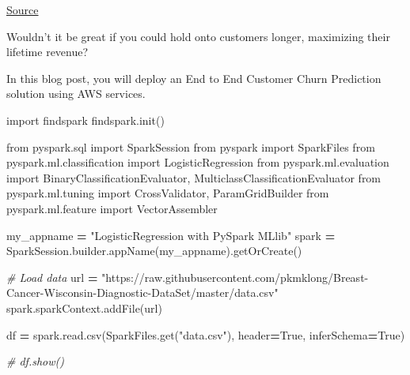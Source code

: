 \documentclass[
]{book}
\newenvironment{Shaded}{\begin{snugshade}}{\end{snugshade}}
\newcommand{\CommentTok}[1]{\textcolor[rgb]{0.56,0.35,0.01}{\textit{#1}}}
\newcommand{\ImportTok}[1]{#1}
\newcommand{\NormalTok}[1]{#1}
\newcommand{\OperatorTok}[1]{\textcolor[rgb]{0.81,0.36,0.00}{\textbf{#1}}}
\newcommand{\StringTok}[1]{\textcolor[rgb]{0.31,0.60,0.02}{#1}}
\newcommand{\VariableTok}[1]{\textcolor[rgb]{0.00,0.00,0.00}{#1}}
\begin{document}
\href{https://towardsdatascience.com/deploying-a-scalable-end-to-end-customer-churn-prediction-solution-with-aws-cbf3536be996}{Source}

Wouldn't it be great if you could hold onto customers longer, maximizing their lifetime revenue?

In this blog post, you will deploy an End to End Customer Churn Prediction solution using AWS services.

\begin{Shaded}
\begin{Highlighting}[]
\ImportTok{import}\NormalTok{ findspark}
\NormalTok{findspark.init()}
\end{Highlighting}
\end{Shaded}

\begin{Shaded}
\begin{Highlighting}[]
\ImportTok{from}\NormalTok{ pyspark.sql }\ImportTok{import}\NormalTok{ SparkSession}
\ImportTok{from}\NormalTok{ pyspark }\ImportTok{import}\NormalTok{ SparkFiles}
\ImportTok{from}\NormalTok{ pyspark.ml.classification }\ImportTok{import}\NormalTok{ LogisticRegression}
\ImportTok{from}\NormalTok{ pyspark.ml.evaluation }\ImportTok{import}\NormalTok{ BinaryClassificationEvaluator, MulticlassClassificationEvaluator}
\ImportTok{from}\NormalTok{ pyspark.ml.tuning }\ImportTok{import}\NormalTok{ CrossValidator, ParamGridBuilder}
\ImportTok{from}\NormalTok{ pyspark.ml.feature }\ImportTok{import}\NormalTok{ VectorAssembler}
\end{Highlighting}
\end{Shaded}

\begin{Shaded}
\begin{Highlighting}[]
\NormalTok{my\_appname }\OperatorTok{=} \StringTok{"LogisticRegression with PySpark MLlib"}
\NormalTok{spark }\OperatorTok{=}\NormalTok{ SparkSession.builder.appName(my\_appname).getOrCreate()}
\end{Highlighting}
\end{Shaded}

\begin{Shaded}
\begin{Highlighting}[]
\CommentTok{\# Load data}
\NormalTok{url }\OperatorTok{=} \StringTok{"https://raw.githubusercontent.com/pkmklong/Breast{-}Cancer{-}Wisconsin{-}Diagnostic{-}DataSet/master/data.csv"}
\NormalTok{spark.sparkContext.addFile(url)}

\NormalTok{df }\OperatorTok{=}\NormalTok{ spark.read.csv(SparkFiles.get(}\StringTok{"data.csv"}\NormalTok{), header}\OperatorTok{=}\VariableTok{True}\NormalTok{, inferSchema}\OperatorTok{=}\VariableTok{True}\NormalTok{)}

\CommentTok{\# df.show()}
\end{Highlighting}
\end{Shaded}
\end{document}
